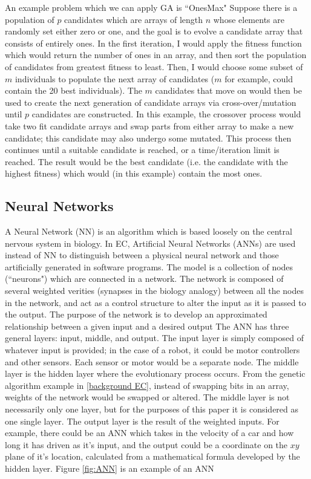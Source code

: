 \documentclass{sig-alternate}
\begin{document}
  An example problem which we can apply GA is ``OnesMax" Suppose there is a population of $p$ candidates which are arrays of length $n$ whose elements are randomly set either zero or one, and the goal is to evolve a candidate array that consists of entirely ones. In the first iteration, I would apply the fitness function which would return the number of ones in an array, and then sort the population of candidates from greatest fitness to least. Then, I would choose some subset of $m$ individuals to populate the next array of candidates ($m$ for example, could contain the 20 best individuals). The $m$ candidates that move on would then be used to create the next generation of candidate arrays via cross-over/mutation until $p$ candidates are constructed. In this example, the crossover process would take two fit candidate arrays and swap parts from either array to make a new candidate; this candidate may also undergo some mutated. This process then continues until a suitable candidate is reached, or a time/iteration limit is reached. The result would be the best candidate (i.e. the candidate with the highest fitness) which would (in this example) contain the most ones.
  
\subsection{Neural Networks}
	A Neural Network (NN) \cite{wiki:robotics} is an algorithm which is based loosely on the central nervous system in biology. In EC, Artificial Neural Networks (ANNs) are used instead of NN to distinguish between a physical neural network and those artificially generated in software programs. The model is a collection of nodes (``neurons") which are connected in a network. The network is composed of several weighted verities (synapses in the biology analogy) between all the nodes in the network, and act as a control structure to alter the input as it is passed to the output. The purpose of the network is to develop an approximated relationship between a given input and a desired output
	 The ANN has three general layers: input, middle, and output. The input layer is simply composed of whatever input is provided; in the case of a robot, it could be motor controllers and other sensors. Each sensor or motor would be a separate node. The middle layer is the hidden layer where the evolutionary process occurs. From the genetic algorithm example in \ref{background EC}, instead of swapping bits in an array, weights of the network would be swapped or altered. The middle layer is not necessarily only one layer, but for the purposes of this paper it is considered as one single layer. The output layer is the result of the weighted inputs. For example, there could be an ANN which takes in the velocity of a car and how long it has driven as it's input, and the output could be a coordinate on the $xy$ plane of it's location, calculated from a mathematical formula developed by the hidden layer. Figure \ref{fig:ANN} is an example of an ANN
  
\end{document}
